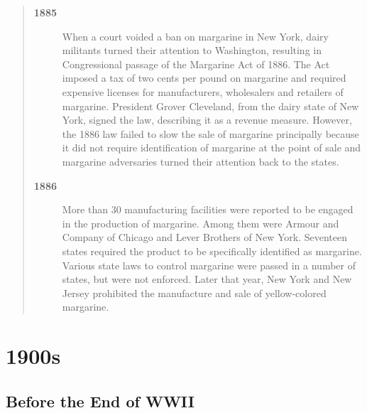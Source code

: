\documentclass[mnsc,blindrev]{informs3} %
\begin{document}
\begin{quotation}
\begin{description}
\item[\bf 1885] When a court voided a ban on margarine in New York,
dairy militants turned their attention to Washington, resulting in
Congressional passage of the Margarine Act of 1886. The Act imposed
a tax of two cents per pound on margarine and required expensive
licenses for manufacturers, wholesalers and retailers of margarine.
President Grover Cleveland, from the dairy state of New York, signed
the law, describing it as a revenue measure. However, the 1886 law
failed to slow the sale of margarine principally because it did not
require identification of margarine at the point of sale and
margarine adversaries turned their attention back to the states.

\item[\bf 1886] More than 30 manufacturing facilities were reported to
be engaged in the production of margarine. Among them were Armour
and Company of Chicago and Lever Brothers of New York. Seventeen
states required the product to be specifically identified as
margarine. Various state laws to control margarine were passed in a
number of states, but were not enforced. Later that year, New York
and New Jersey prohibited the manufacture and sale of yellow-colored
margarine.

\end{description}

\end{quotation}



\section{1900s}

\subsection{Before the End of WWII}
\end{document}
